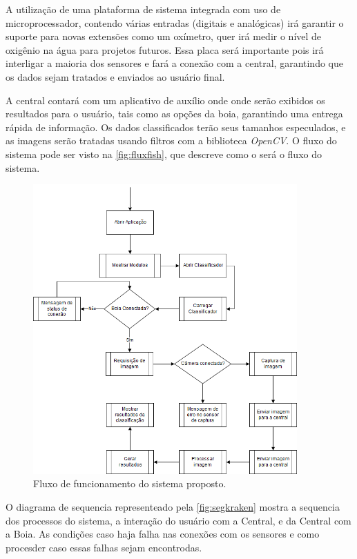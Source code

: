 A utilização de uma plataforma de sistema integrada com uso de microprocessador, contendo várias entradas (digitais e analógicas) irá garantir o suporte para novas extensões como um oxímetro, quer irá medir o nível de oxigênio na água para projetos futuros. Essa placa será importante pois irá interligar a maioria dos sensores e fará a conexão com a central, garantindo que os dados sejam tratados e enviados ao usuário final.

A central contará com um aplicativo de auxílio onde onde serão exibidos os resultados para o usuário, tais como as opções da boia, garantindo uma entrega rápida de informação. Os dados classificados terão seus tamanhos especulados, e as imagens serão tratadas usando filtros com a biblioteca \textit{OpenCV}. O fluxo do sistema pode ser visto na \autoref{fig:fluxfish}, que descreve como o será o fluxo do sistema.

\begin{figure}[ht]
	\caption{\label{fig:fluxfish}  Fluxo de funcionamento do sistema proposto.}
	 \begin{center}
		\includegraphics[width = 0.9\textwidth]			{resources/fluxogeral}
    \end{center}
\end{figure}

O diagrama de sequencia representeado pela \autoref{fig:segkraken} mostra a sequencia dos processos do sistema, a interação do usuário com a Central, e da Central com a Boia. As condições caso haja falha nas conexões com os sensores e como procesder caso essas falhas sejam encontrodas.

